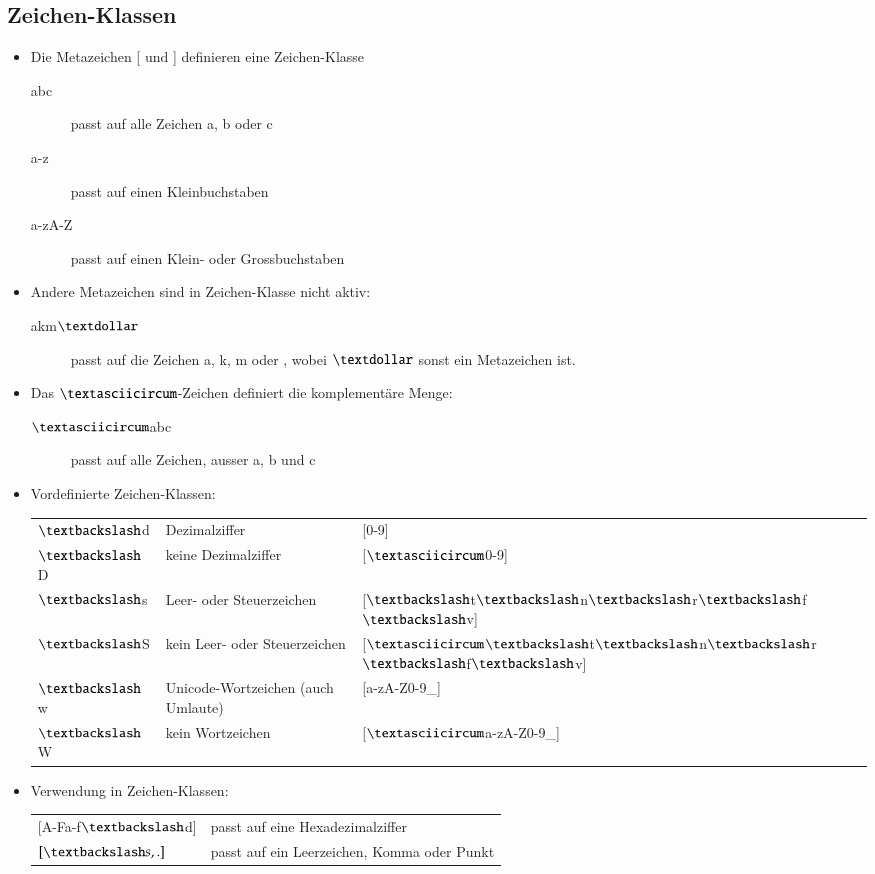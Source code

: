 \subsection{Zeichen-Klassen}
\begin{itemize}
	\item Die Metazeichen [ und ] definieren eine Zeichen-Klasse
	\begin{description}
		\item[abc] passt auf alle Zeichen a, b oder c
		\item[a-z] passt auf einen Kleinbuchstaben
		\item[a-zA-Z] passt auf einen Klein- oder Grossbuchstaben
	\end{description}
	\item Andere Metazeichen sind in Zeichen-Klasse nicht aktiv:
	\begin{description}
		\item[akm$\textdollar$] passt auf die Zeichen a, k, m oder \textdollar, wobei $\textdollar$ sonst ein Metazeichen ist. 
	\end{description}
	\item Das $\textasciicircum$-Zeichen definiert die komplementäre Menge:
	\begin{description}
		\item[$\textasciicircum$abc] passt auf alle Zeichen, ausser a, b und c
	\end{description}
	\item Vordefinierte Zeichen-Klassen:\\
	\begin{tabular}{lll}
		$\textbackslash$d& Dezimalziffer& [0-9]\\ 
		$\textbackslash$D& keine Dezimalziffer& [$\textasciicircum$0-9]\\ 
		$\textbackslash$s& Leer- oder Steuerzeichen& [$\textbackslash$t$\textbackslash$n$\textbackslash$r$\textbackslash$f$\textbackslash$v]\\ 
		$\textbackslash$S& kein Leer- oder Steuerzeichen& [$\textasciicircum$$\textbackslash$t$\textbackslash$n$\textbackslash$r$\textbackslash$f$\textbackslash$v]\\ 
		$\textbackslash$w& Unicode-Wortzeichen (auch Umlaute)& [a-zA-Z0-9\_]\\ 
		$\textbackslash$W& kein Wortzeichen& [$\textasciicircum$a-zA-Z0-9\_]\\ 
	\end{tabular}
	\item Verwendung in Zeichen-Klassen:\\
	\begin{tabular}{ll}
		[A-Fa-f$\textbackslash$d]& passt auf eine Hexadezimalziffer\\
		$[\textbackslash s,.]$& passt auf ein Leerzeichen, Komma oder Punkt\\
	\end{tabular}
\end{itemize}

